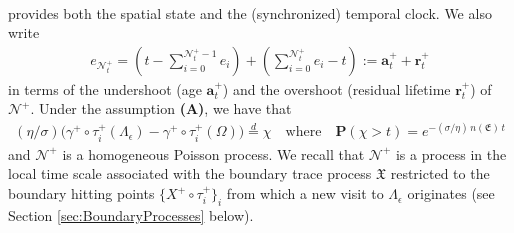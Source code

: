 \documentclass[11pt,a4paper]{article}
\begin{document}
{\begin{align*}
\end{align*}
provides both the spatial state and the (synchronized) temporal clock. We also write
\begin{align*}
e_{\mathcal{N}^+_t} = \left( t -  \sum_{i=0}^{\mathcal{N}^+_t-1} e_i \right) + \left( \sum_{i=0}^{\mathcal{N}^+_t} e_i - t \right) := \mathbf{a}^+_t + \mathbf{r}^+_t
\end{align*}
in terms of the undershoot (age $\mathbf{a}^+_t$) and the overshoot (residual lifetime $\mathbf{r}^+_t$) of $\mathcal{N}^+$. Under the assumption {\bf (A)}, we have that 
\begin{align*}
(\eta/\sigma) \Big(\gamma^+ \circ \tau^+_i(\Lambda_\epsilon) - \gamma^+ \circ \tau^+_i(\Omega) \Big) \stackrel{d}{=} \chi \quad \textrm{where} \quad \mathbf{P}(\chi > t) = e^{-(\sigma/\eta)\, n(\mathfrak{E})\, t}
\end{align*}
and $\mathcal{N}^+$ is a homogeneous Poisson process. We recall that $\mathcal{N}^+$ is a process in the local time scale associated with the boundary trace process $\mathfrak{X}$ restricted to the boundary hitting points $\{X^+ \circ \tau^+_i\}_i$ from which a new visit to $\Lambda_\epsilon$ originates (see Section \ref{sec:BoundaryProcesses} below).  




}
\end{document}
